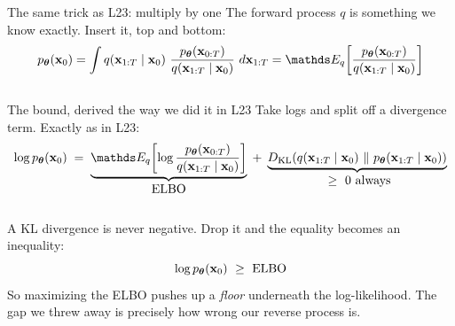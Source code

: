 \documentclass[aspectratio=169]{beamer}
\begin{document}
\begin{frame}{The same trick as L23: multiply by one}
  \small
  The forward process $q$ is something we know exactly. Insert it, top and bottom:
  \[
    p_{\thetav}(\xv_0)
    = \int q(\xv_{1:T}\mid \xv_0)\ \frac{p_{\thetav}(\xv_{0:T})}{q(\xv_{1:T}\mid \xv_0)}\ d\xv_{1:T}
    = \E_{q}\!\left[\frac{p_{\thetav}(\xv_{0:T})}{q(\xv_{1:T}\mid \xv_0)}\right]
  \]
  \vskip 4pt
  \begin{columns}[T]
  \end{columns}
\end{frame}

\begin{frame}{The bound, derived the way we did it in L23}
  \small
  Take logs and split off a divergence term. Exactly as in L23:
  \[
    \log p_{\thetav}(\xv_0)
    \;=\;
    \underbrace{\E_q\!\left[\log \frac{p_{\thetav}(\xv_{0:T})}{q(\xv_{1:T}\mid \xv_0)}\right]}_{\displaystyle \text{ELBO}}
    \;+\;
    \underbrace{D_{\mathrm{KL}}\!\left(q(\xv_{1:T}\mid \xv_0)\ \|\ p_{\thetav}(\xv_{1:T}\mid \xv_0)\right)}_{\displaystyle \ \geq\ 0\ \text{always}}
  \]
  \vskip 4pt
  \begin{columns}[T]
    A KL divergence is never negative. Drop it and the equality becomes an inequality:
    \[ \log p_{\thetav}(\xv_0) \ \geq\ \text{ELBO} \]
    \footnotesize
    So maximizing the ELBO pushes up a \emph{floor} underneath the log-likelihood. The
    gap we threw away is precisely how wrong our reverse process is.
  \end{columns}
\end{frame}
\end{document}
